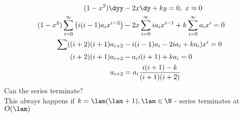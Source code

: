 \documentclass[Maths.tex]{subfiles}
\begin{document}
\begin{example}
\begin{align}
    (1-x^2)\dyy &- 2x\dy + ky = 0,~ x \approx 0 \\
    (1-x^2)\sum_{i=0}^\infty \left(i(i-1)a_ix^{i-2}\right) &- 2x\sum_{i=0}^\infty ia_ix^{i-1} + k\sum_{i=0}^\infty a_ix^i = 0 \\
    \sum((i+2)(i+1)a_{i+2} &- i(i-1)a_i - 2ia_i + ka_i)x^i = 0 \\
    (i+2)(i+1)a_{i+2} &- a_ii(i+1) + ka_i = 0 \\
    a_{i+2} &= a_i \frac{i(i+1)-k}{(i+1)(i+2)}
\end{align}
Can the series terminate? \\
This always happens if $k = \lam(\lam+1), \lam \in \N$ - series terminates at $O(\lam)$
\end{example}
\end{document}
